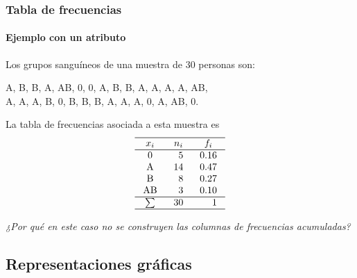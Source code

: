 \begin{frame}
\frametitle{Tabla de frecuencias}
\framesubtitle{Ejemplo con un atributo}
Los grupos sanguíneos de una muestra de 30 personas son:
\begin{center}
A, B, B, A, AB, 0, 0, A, B, B, A, A, A, A, AB,\\
A, A, A, B, 0, B, B, B, A, A, A, 0, A, AB, 0. 
\end{center}
La tabla de frecuencias asociada a esta muestra es
\[
\setlength\arraycolsep{3mm}
\setlength\arrayrulewidth{0.5pt}
\begin{array}{crr}
\hline
\multicolumn{1}{c}{x_i} & \multicolumn{1}{c}{n_i} & \multicolumn{1}{c}{f_i} \\
\hline
\mbox{0} & 5 & 0.16 \\
\mbox{A} & 14 & 0.47 \\
\mbox{B} & 8 & 0.27 \\
\mbox{AB} & 3 & 0.10 \\
\hline 
\sum & 30 & 1 \\
\hline
\end{array}
\]
\begin{center}
\emph{¿Por qué en este caso no se construyen las columnas de frecuencias acumuladas?}
\end{center}
\end{frame}


\subsection{Representaciones gráficas}

